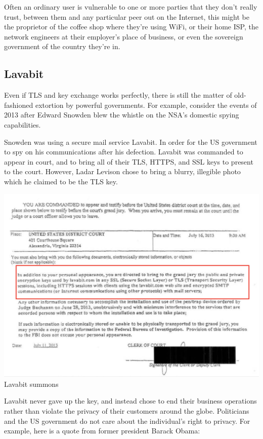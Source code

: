 \documentclass[11pt]{article} %
\begin{document}
\bigskip
{\parindent0pt Often an ordinary user is vulnerable to one or more parties that 
they don't really trust, between them and any particular peer out on the 
Internet, this might be the proprietor of the coffee shop where they're using 
WiFi, or their home ISP, the network engineers at their employer's place of 
business, or even the sovereign government of the country they're in.}

\subsection{Lavabit}
{\parindent0pt Even if TLS and key exchange works perfectly, there is still the
matter of old-fashioned extortion by powerful governments. For example, consider
the events of 2013 after Edward Snowden blew the whistle on the NSA's domestic 
spying capabilities.}

\bigskip
{\parindent0pt Snowden was using a secure mail service Lavabit. In order for 
the US government to spy on his communications after his defection. Lavabit was
commanded to appear in court, and to bring all of their TLS, HTTPS, and SSL keys
to present to the court. However, Ladar Levison chose to bring a blurry, 
illegible photo which he claimed to be the TLS key.}

\begin{center}
\includegraphics[scale=.3]{./lavabit-summons.png}
\\Lavabit summons
\end{center}

{\parindent0pt Lavabit never gave up the key, and instead chose to end their 
business operations rather than violate the privacy of their customers around 
the globe.  Politicians and the US government do not care about the individual's
right to privacy. For example, here is a quote from former president Barack 
Obama:}
\end{document}
